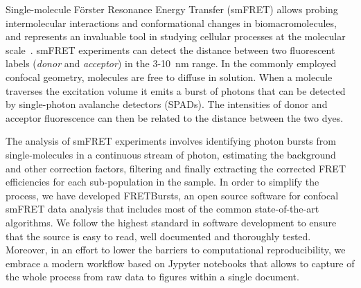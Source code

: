 Single-molecule Förster Resonance Energy Transfer (smFRET) allows probing intermolecular interactions
and conformational changes in biomacromolecules, and represents an 
invaluable tool in studying cellular processes at the molecular 
scale~\cite{Kapanidis_2006}. smFRET experiments can detect the distance between 
two fluorescent labels (\textit{donor} and \textit{acceptor}) in the 
3-10~nm range. In the commonly employed confocal geometry, molecules are free 
to diffuse in solution. When a molecule traverses the excitation volume it 
emits a burst of photons that can be detected by single-photon avalanche detectors (SPADs). 
The intensities of donor and acceptor fluorescence 
can then be related to the distance between the two dyes.

The analysis of smFRET experiments involves identifying photon bursts from 
single-molecules in a continuous stream of photon, estimating the 
background and other correction factors, filtering and finally extracting the corrected 
FRET efficiencies for each sub-population in the sample. In order to simplify 
the process, we have developed FRETBursts, an open source software for confocal smFRET data 
analysis that includes most of the common state-of-the-art algorithms. 
We follow the highest standard in software development to ensure that 
the source is easy to read, well documented and thoroughly tested. 
Moreover, in an effort to lower the barriers to computational reproducibility, 
we embrace a modern workflow based on Jypyter notebooks that allows to capture 
of the whole process from raw data to figures within a single document.
